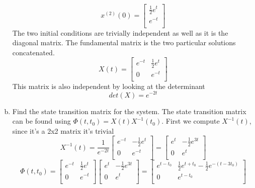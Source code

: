 \documentclass{article}
\begin{document}
\begin{enumerate}[a.]
$$x^{(2)}(0) =
\begin{bmatrix}
\frac{1}{2} e^{t}\\
e^{-t}\\
\end{bmatrix}
$$
The two initial conditions are trivially independent as well as it is the diagonal matrix.
The fundamental matrix is the two particular solutions concatenated.
$$
X(t) =
\begin{bmatrix}
e^{-t} & \frac{1}{2} e^{t} \\
0 & e^{-t} \\
\end{bmatrix}
$$
This matrix is also independent by looking at the determinant
$$ det(X) = e^{-2t} $$

\item Find the state transition matrix for the system.
\newline
The state transition matrix can be found using $ \Phi (t,t_0) = X(t)X^{-1}(t_0)$.
First we compute $X^{-1}(t)$, since it's a 2x2 matrix it's trivial
$$X^{-1}(t) =
\frac{1}{e^{-2t}}
\begin{bmatrix}
e^{-t} & -\frac{1}{2} e^{t} \\
0 & e^{-t} \\
\end{bmatrix}
=
\begin{bmatrix}
e^{t} & -\frac{1}{2}e^{3t} \\
0 & e^{t} \\
\end{bmatrix}
$$
$$
\Phi(t,t_0) =
\begin{bmatrix}
e^{-t} & \frac{1}{2} e^{t} \\
0 & e^{-t} \\
\end{bmatrix}
\begin{bmatrix}
e^{t} & -\frac{1}{2}e^{3t} \\
0 & e^{t} \\
\end{bmatrix}
=
\begin{bmatrix}
e^{t - t_0} & \frac{1}{2}e^{t+t_0}-\frac{1}{2} e^{-(t - 3 t_0)} \\
0 & e^{t-t_0} \\
\end{bmatrix}
$$


\end{enumerate}
\end{document}
